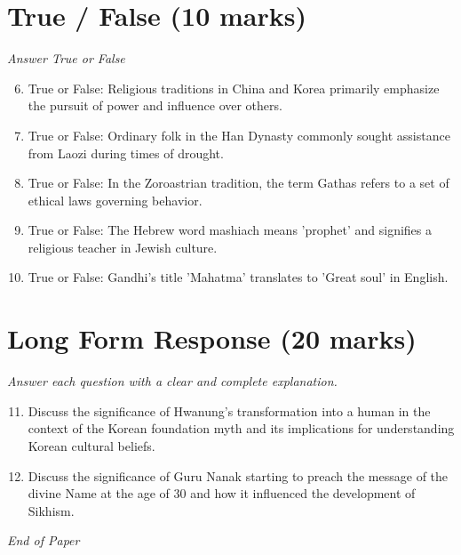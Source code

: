 \documentclass[12pt]{article}
\begin{document}
\section*{True / False (10 marks)}
\textit{Answer True or False}
\begin{enumerate}[label=\arabic*.]
\setcounter{enumi}{5}
\item True or False: Religious traditions in China and Korea primarily emphasize the pursuit of power and influence over others.
\item True or False: Ordinary folk in the Han Dynasty commonly sought assistance from Laozi during times of drought.
\item True or False: In the Zoroastrian tradition, the term Gathas refers to a set of ethical laws governing behavior.
\item True or False: The Hebrew word mashiach means 'prophet' and signifies a religious teacher in Jewish culture.
\item True or False: Gandhi's title 'Mahatma' translates to 'Great soul' in English.
\end{enumerate}

\section*{Long Form Response (20 marks)}
\textit{Answer each question with a clear and complete explanation.}
\begin{enumerate}[label=\arabic*.]
\setcounter{enumi}{10}
\item Discuss the significance of Hwanung's transformation into a human in the context of the Korean foundation myth and its implications for understanding Korean cultural beliefs.
\item Discuss the significance of Guru Nanak starting to preach the message of the divine Name at the age of 30 and how it influenced the development of Sikhism.
\end{enumerate}

\vfill
\noindent\textit{End of Paper}
\end{document}
